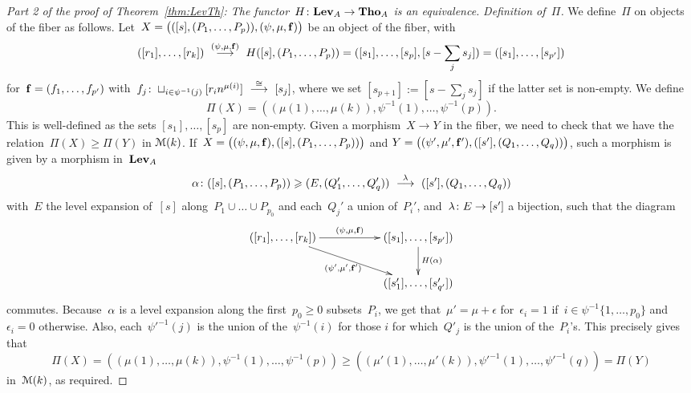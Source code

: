 \begin{proof}[Part 2 of the proof of Theorem~\ref{thm:LevTh}: The functor~$H\colon\mathbf{Lev}_A\to \mathbf{Tho}_A$ is an equivalence]
\noindent
{\em Definition of~$\Pi$.} We define~$\Pi$ on objects of the fiber as follows. Let~$X=\big(([s],(P_1,\dots,P_p)),(\psi,\mu,{\bf f})\big)$ be an object of the fiber, with 
$$([r_1],\dots,[r_k]) \ \stackrel{(\psi,\mu,{\bf f})}{\longrightarrow}\ H([s],(P_1,\dots,P_p))= ([s_1],\dots,[s_p],[s-\sum_js_j])= ([s_1],\dots,[s_{p'}])$$
for~${\bf f}=(f_1,\dots,f_{p'})$ with~$f_j\colon\sqcup_{i\in \psi^{-1}(j)}[r_in^{\mu(i)}] \ \stackrel{\cong}{\longrightarrow} \ [s_j]$, where we set $[s_{p+1}]:=[s-\sum_js_j]$ if the latter set is non-empty. 
We define 
$$\Pi(X)=((\mu(1),\dots,\mu(k)),\psi^{-1}(1),\dots,\psi^{-1}(p)).$$ 
This is well-defined as the sets $[s_1],\dots,[s_p]$ are non-empty. 
Given a morphism~$X\to Y$ in the fiber, we need to check that we have the relation~$\Pi(X)\ge \Pi(Y)$ in $\mathcal{M}(k)$. If~\hbox{$X=\big((\psi,\mu,{\bf f}),([s],(P_1,\dots,P_p))\big)$} and 
$Y=\big((\psi',\mu',{\bf f'}),([s'],(Q_1,\dots,Q_q))\big)$, such a morphism is given by a morphism in~$\mathbf{Lev}_A$
$$\al\colon([s],(P_1,\dots,P_p))\ge (E,(Q_1',\dots,Q_q')) \ \stackrel{\la}\rar\ ([s'],(Q_1,\dots,Q_q))$$
with~$E$ the level expansion of~$[s]$ along~$P_1\cup\dots\cup P_{p_0}$ and each~$Q_j'$ a union of~$P_i'$, and~$\lambda\colon E\to [s']$ a bijection, such that the diagram 
\begin{equation}\label{equ:morfib}
\xymatrix{([r_1],\dots,[r_k])\ar[rr]^-{(\psi,\mu,{\bf f})} \ar[drr]_-{(\psi',\mu',{\bf f'})} && ([s_1],\dots,[s_{p'}]) \ar[d]^{H(\al)}\\
&& ([s'_1],\dots,[s'_{q'}])
}\end{equation}
commutes. 
Because~$\alpha$ is a level expansion along the first~$p_0\ge 0$ subsets~$P_i$, we get that~$\mu'=\mu+\epsilon$ for~\hbox{$\epsilon_i=1$} if~\hbox{$i\in \psi^{-1}\{1,\dots,p_0\}$} and $\epsilon_i=0$ otherwise. Also, each~$\psi'^{-1}(j)$ is the union of the~$\psi^{-1}(i)$ for those $i$ for which~$Q'_j$ is the union of the~$P_i$'s. This precisely gives that 
$$\Pi(X)=((\mu(1),\dots,\mu(k)),\psi^{-1}(1),\dots,\psi^{-1}(p))\ge ((\mu'(1),\dots,\mu'(k)),\psi'^{-1}(1),\dots,\psi'^{-1}(q))=\Pi(Y)$$ in~$\mathcal{M}(k)$, as required. 


\end{proof}
